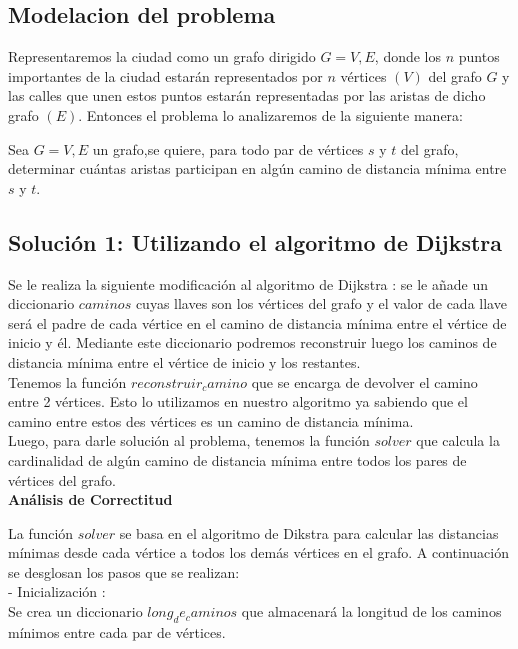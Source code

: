 \documentclass[
10pt, %
a4paper, %
oneside, %
headinclude,footinclude, %
BCOR5mm, %
]{scrartcl}
\begin{document}
\subsection{Modelacion del problema}

Representaremos la ciudad como un grafo dirigido $G = {V,E}$, donde los $n$ puntos importantes
de la ciudad estarán representados por $n$ vértices $(V)$ del grafo $G$ y las calles que unen estos 
puntos estarán representadas por las aristas de dicho grafo $(E)$. Entonces el problema lo analizaremos
de la siguiente manera:

Sea $G = {V,E}$ un grafo,se quiere, para todo par de vértices $s$ y $t$ del grafo, determinar cuántas aristas 
participan en algún camino de distancia mínima entre $s$ y $t$.


\subsection{Solución 1: Utilizando el algoritmo de Dijkstra}

Se le realiza la siguiente modificación al algoritmo de Dijkstra : se le 
añade un diccionario $caminos$ cuyas llaves son los vértices del grafo 
y el valor de cada llave será el padre de cada vértice en el camino de distancia 
mínima entre el vértice de inicio y él. Mediante este diccionario podremos reconstruir 
luego los caminos de distancia mínima entre el vértice de inicio y los restantes. \\

Tenemos la función $reconstruir_camino$ que se encarga de devolver el camino entre 2 vértices. Esto 
lo utilizamos en nuestro algoritmo ya sabiendo que el camino entre estos des vértices es un camino de 
distancia mínima.\\

Luego, para darle solución al problema, tenemos la función $solver$ que calcula la cardinalidad de algún 
camino de distancia mínima entre todos los pares de vértices del grafo.\\


\textbf{Análisis de Correctitud}

La función $solver$ se basa en el algoritmo de Dikstra para calcular las distancias mínimas desde 
cada vértice a todos los demás vértices en el grafo. A continuación se desglosan los pasos que se realizan:\\

- Inicialización :\\
Se crea un diccionario ${long_de_caminos}$ que almacenará la longitud de los caminos mínimos entre cada par de 
vértices.
\end{document}
